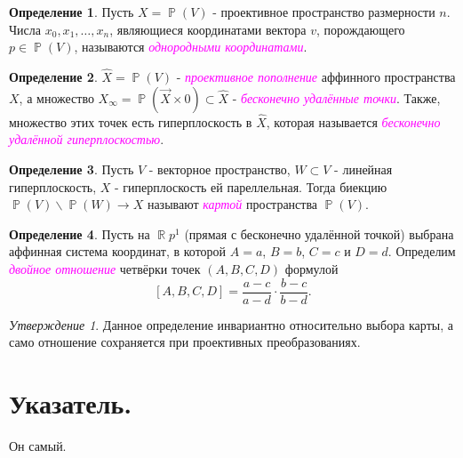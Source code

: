 \documentclass[a4paper,100pt]{article}
\theoremstyle{indented}
\theoremstyle{definition}
\newtheorem{defn}{Определение}
\theoremstyle{remark}
\newtheorem{stat}{Утверждение}
\DeclareMathOperator{\ra}{\rightarrow}
\DeclareMathOperator{\RR}{\mathbb{R}}
\DeclareMathOperator{\PP}{\mathbb{P}}
\begin{document}
\begin{defn}
    Пусть $X=\PP(V)$ - проективное пространство размерности $n$. Числа $x_0, x_1, \ldots, x_n$, являющиеся координатами вектора $v$, порождающего $p\in \PP(V)$, называются \textit{\textcolor{magenta}{\hypertarget{s36}{однородными координатами}}}.
\end{defn}

\begin{defn}
    $\hat{X}=\PP(V)$ - \textit{\textcolor{magenta}{\hypertarget{s37}{проективное пополнение}}} аффинного пространства $X$, а множество $X_\infty = \PP(\vec{X}\times 0)\subset \hat{X}$ - \textit{\textcolor{magenta}{\hypertarget{s38}{бесконечно удалённые точки}}}. Также, множество этих точек есть гиперплоскость в $\hat{X}$, которая называется \textit{\textcolor{magenta}{\hypertarget{s39}{бесконечно удалённой гиперплоскостью}}}.
\end{defn}

\begin{defn}
    Пусть $V$ - векторное пространство, $W\subset V$ - линейная гиперплоскость, $X$ - гиперплоскость ей пареллельная. Тогда биекцию $\PP(V) \backslash \PP(W) \ra X$ называют \textit{\textcolor{magenta}{\hypertarget{s40}{картой}}} пространства $\PP(V)$.
\end{defn}

\begin{defn}
    Пусть на $\RR p^1$ (прямая с бесконечно удалённой точкой) выбрана аффинная система координат, в которой $A=a$, $B=b$, $C=c$ и $D=d$. Определим \textit{\textcolor{magenta}{\hypertarget{s41}{двойное отношение}}} четвёрки точек $(A, B, C, D)$ формулой
    \[
        [A, B, C, D]=\frac{a-c}{a-d}\cdot \frac{b-c}{b-d}.
    \]
\end{defn}

\begin{stat}
    Данное определение инвариантно относительно выбора карты, а само отношение сохраняется при проективных преобразованиях.
\end{stat}

\newpage

\section{Указатель.}

\hypertarget{t2}{Он самый.}
\end{document}
